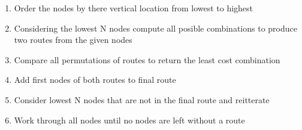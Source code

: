 \documentclass[a4paper,12pt,twoside]{article}
\begin{document}
\begin{enumerate}
\setlength{\itemsep}{-10pt}
\item Order the nodes by there vertical location from lowest to highest
\item Considering the lowest N nodes compute all posible combinations to produce two routes from the given nodes
\item Compare all permutations of routes to return the least cost combination
\item Add first nodes of both routes to final route
\item Consider lowest N nodes that are not in the final route and reitterate
\item Work through all nodes until no nodes are left without a route

\end{enumerate}
\end{document}

